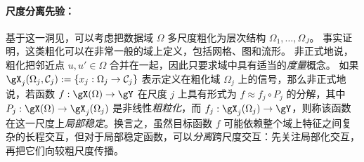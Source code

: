 





\paragraph{尺度分离先验：}
基于这一洞见，可以考虑把数据域 $\Omega$ 多尺度粗化为层次结构 $\Omega_1, \hdots, \Omega_J$。
事实证明，这类粗化可以在非常一般的域上定义，包括网格、图和流形。
非正式地说，粗化把邻近点 $u, u' \in \Omega$ 合并在一起，因此只要求域中具有适当的{\em 度量}概念。
如果 $\gX_{j}(\Omega_j,\mathcal{C}_j) := \{x_j: \Omega_j \to \mathcal{C}_j \}$
表示定义在粗化域 $\Omega_j$ 上的信号，那么非正式地说，若函数 $f : \gX(\Omega) \to \gY$ 在尺度 $j$ 上具有形式为 $f \approx f_j \circ P_j $ 的分解，其中 $P_j : \gX(\Omega) \to \gX_{j}(\Omega_j)$ 是非线性\emph{粗粒化}，而 $f_j : \gX_{j}(\Omega_j) \to \gY$，则称该函数在这一尺度上\emph{局部稳定}。换言之，虽然目标函数 $f$ 可能依赖整个域上特征之间复杂的长程交互，但对于局部稳定函数，可以\emph{分离}跨尺度交互：先关注局部化交互，再把它们向较粗尺度传播。

